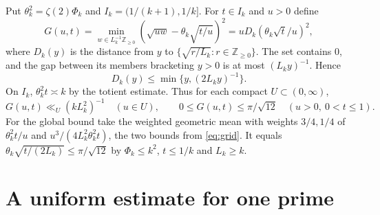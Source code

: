 \documentclass[11pt]{amsart}
\theoremstyle{remark}
\newcommand{\Z}{\mathbb Z}
\begin{document}
Put \(\theta_k^2=\zeta(2)\Phi_k\) and \(I_k=(1/(k+1),1/k]\).
For \(t\in I_k\) and \(u>0\) define
\begin{equation}\label{eq:G}
 G(u,t)=\min_{w\in L_k^{-1}\Z_{\ge0}}
   \left(\sqrt{uw}-\theta_k\sqrt{t/u}\right)^2
   =uD_k(\theta_k\sqrt t/u)^2 ,
\end{equation}
where \(D_k(y)\) is the distance from \(y\) to
\(\{\sqrt{r/L_k}:r\in\Z_{\ge0}\}\).
The set contains \(0\), and the gap between its members bracketing
\(y>0\) is at most \((L_k y)^{-1}\). Hence
\begin{equation}\label{eq:grid}
 D_k(y)\le\min\{y,(2L_ky)^{-1}\}.
\end{equation}
On \(I_k\), \(\theta_k^2t\asymp k\) by the totient estimate. Thus for
each compact \(U\subset(0,\infty)\),
\begin{equation}\label{eq:G-bounds}
 G(u,t)\ll_U(kL_k^2)^{-1}\quad(u\in U),\qquad
 0\le G(u,t)\le \pi/\sqrt{12}\quad(u>0,\ 0<t\le1).
\end{equation}
For the global bound take the weighted geometric mean with weights
\(3/4,1/4\) of \(\theta_k^2t/u\) and \(u^3/(4L_k^2\theta_k^2t)\),
the two bounds from \eqref{eq:grid}.
It equals \(\theta_k\sqrt{t/(2L_k)}\le\pi/\sqrt{12}\) by
\(\Phi_k\le k^2\), \(t\le1/k\) and \(L_k\ge k\).

\section{A uniform estimate for one prime}\label{sec:block-estimate}
\end{document}
